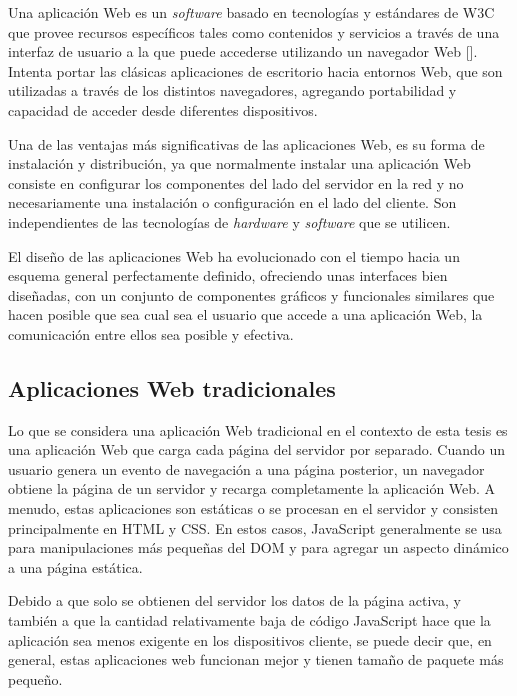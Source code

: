 Una aplicación Web es un \textit{software} basado en tecnologías y estándares de W3C que provee recursos específicos tales como contenidos y servicios a través de una interfaz de usuario a la que puede accederse utilizando un navegador Web [\cite{100}]. Intenta portar las clásicas aplicaciones de escritorio hacia entornos Web, que son utilizadas a través de los distintos navegadores, agregando portabilidad y capacidad de acceder desde diferentes dispositivos.

Una de las ventajas más significativas de las aplicaciones Web, es su forma de instalación y distribución, ya que normalmente instalar una aplicación Web consiste en configurar los componentes del lado del servidor en la red y no necesariamente una instalación o configuración en el lado del cliente. Son independientes de las tecnologías de \textit{hardware} y \textit{software} que se utilicen.


El diseño de las aplicaciones Web ha evolucionado con el tiempo hacia un esquema general perfectamente definido, ofreciendo unas interfaces bien diseñadas, con un conjunto de componentes gráficos y funcionales similares que hacen posible que sea cual sea el usuario que accede a una aplicación Web, la comunicación entre ellos sea posible y efectiva.

\subsection{Aplicaciones Web tradicionales}
Lo que se considera una aplicación Web tradicional en el contexto de esta tesis es una aplicación Web que carga cada página del servidor por separado. Cuando un usuario genera un evento de navegación a una página posterior, un navegador obtiene la página de un servidor y recarga completamente la aplicación Web. A menudo, estas aplicaciones son estáticas o se procesan en el servidor y consisten principalmente en HTML y CSS. En estos casos, JavaScript generalmente se usa para manipulaciones más pequeñas del DOM y para agregar un aspecto dinámico a una página estática.

Debido a que solo se obtienen del servidor los datos de la página activa, y también a que la cantidad relativamente baja de código JavaScript hace que la aplicación sea menos exigente en los dispositivos cliente, se puede decir que, en general, estas aplicaciones web funcionan mejor y tienen tamaño de paquete más pequeño.

